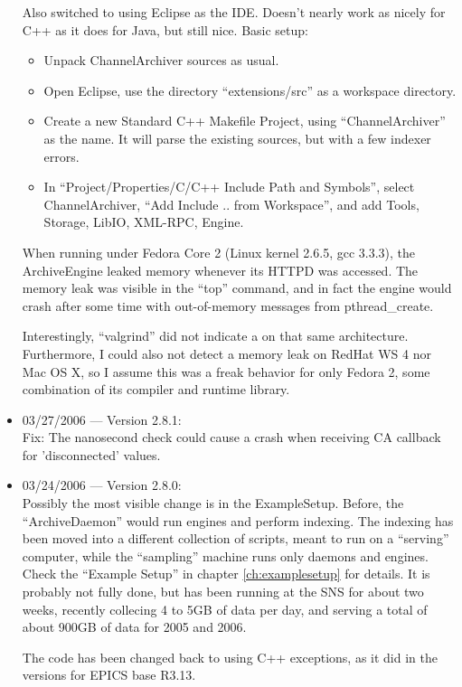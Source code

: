 \begin{itemize}
Also switched to using Eclipse as the IDE.
Doesn't nearly work as nicely for C++ as it does for Java,
but still nice.
Basic setup:
\begin{itemize}
\item Unpack ChannelArchiver sources as usual.
\item Open Eclipse, use the directory ``extensions/src'' as a
      workspace directory.
\item Create a new Standard C++ Makefile Project, using
      ``ChannelArchiver'' as the name. It will parse the existing
      sources, but with a few indexer errors.
\item In ``Project/Properties/C/C++ Include Path and Symbols'',
      select ChannelArchiver, ``Add Include .. from Workspace'',
      and add Tools, Storage, LibIO, XML-RPC, Engine.
\end{itemize}

\NOTE When running under Fedora Core 2 (Linux kernel 2.6.5,
gcc 3.3.3), the ArchiveEngine leaked memory whenever its HTTPD
was accessed. The memory leak was visible in the ``top'' command,
and in fact the engine would crash after some time with out-of-memory messages
from pthread\_create.

Interestingly, ``valgrind'' did not indicate a  on that
same architecture. Furthermore, I could also not detect a memory leak on RedHat WS 4
nor Mac OS X, so I assume this was a freak behavior for only Fedora 2,
some combination of its compiler and runtime library. 

\item 03/27/2006 --- Version 2.8.1:\\
Fix: The nanosecond check could cause a crash when receiving
CA callback for 'disconnected' values.

\item 03/24/2006 --- Version 2.8.0:\\
Possibly the most visible change is in the ExampleSetup.
Before, the ``ArchiveDaemon'' would run engines and perform indexing.
The indexing has been moved into a different collection of scripts,
meant to run on a ``serving'' computer, while the ``sampling'' machine
runs only daemons and engines.
Check the ``Example Setup'' in chapter \ref{ch:examplesetup} for details.
It is probably not fully done, but has been running at the SNS for
about two weeks, recently collecing 4 to 5GB of data per day,
and serving a total of about 900GB of data for 2005 and 2006.

The code has been changed back to using C++ exceptions, as it did in
the versions for EPICS base R3.13.


\end{itemize}
